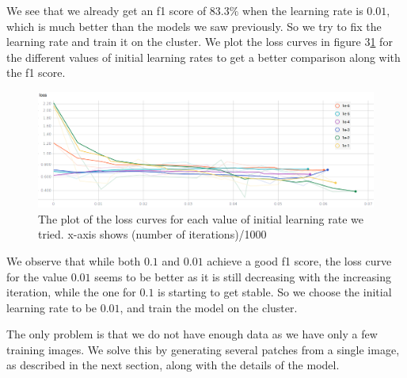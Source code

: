 \documentclass[10pt,conference,compsocconf]{IEEEtran}
\begin{document}
We see that we already get an f1 score of $83.3\%$ when the learning rate is $0.01$, which is much better than the models we saw previously. So we try to fix the learning rate and train it on the cluster. We plot the loss curves in figure 3\ref{loss} for the different values of initial learning rates to get a better comparison along with the f1 score.  
\begin{figure}\label{loss}
 \center
 \includegraphics[scale=0.25]{loss_curves.png}
 \caption{The plot of the loss curves for each value of initial learning rate we tried. x-axis shows (number of iterations)/1000}
\end{figure}
We observe that while both $0.1$ and $0.01$ achieve a good f1 score, the loss curve for the value $0.01$ seems to be better as it is still decreasing with the increasing iteration, while the one for $0.1$ is starting to get stable. So we choose the initial learning rate to be $0.01$, and train the model on the cluster.

The only problem is that we do not have enough data as we have only a few training images. We solve this by generating several patches from a single image, as described in the next section, along with the details of the model.






\end{document}

